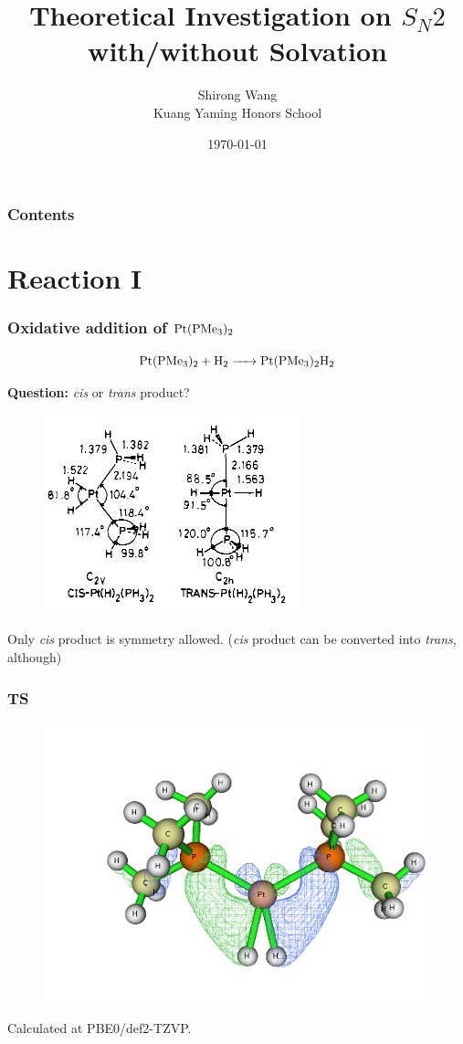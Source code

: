 \documentclass[10pt,aspectratio=43,mathserif]{beamer}
\title{Theoretical Investigation on $ S_N 2 $ with/without Solvation}	        %
\author[]{            %
    Shirong Wang\\[0.3cm]
    Kuang Yaming Honors School}
\date{\today}
\begin{document}
\begin{frame}
\titlepage
\end{frame}

\begin{frame}
\frametitle{Contents}
\tableofcontents
\end{frame}

\section{Reaction I}
\begin{frame}
\frametitle{Oxidative addition of $ \ce{Pt(PMe_3)_2} $}
\begin{equation}\label{key}
\ce{Pt(PMe_3)_2 + H_2 -> Pt(PMe_3)_2H_2}
\end{equation}

\end{frame}

\begin{frame}
\textbf{Question:} \textsl{cis} or \textsl{trans} product?\\

\begin{figure}[H]
	\includegraphics[width=0.45\linewidth]{Pt1.jpg}
\end{figure}
Only \textsl{cis} product is symmetry allowed. (\textsl{cis} product can be converted into \textsl{trans}, although)\\

\end{frame}

\begin{frame}
\frametitle{TS}
\begin{figure}
	\includegraphics[width=0.45\linewidth]{Pt_tsb_orb.png}
\end{figure}
Calculated at PBE0/def2-TZVP.
\end{frame}
\end{document}
